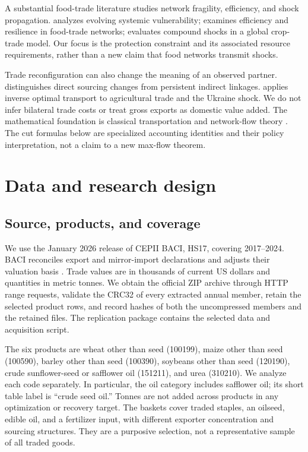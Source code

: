 \documentclass[11pt,a4paper]{article}
\begin{document}
A substantial food-trade literature studies network fragility, efficiency, and shock propagation. \citet{puma} analyzes evolving systemic vulnerability; \citet{karakoc} examines efficiency and resilience in food-trade networks; \citet{verschuur} evaluates compound shocks in a global crop-trade model. Our focus is the protection constraint and its associated resource requirements, rather than a new claim that food networks transmit shocks.

Trade reconfiguration can also change the meaning of an observed partner. \citet{freund} distinguishes direct sourcing changes from persistent indirect linkages. \citet{gaskin} applies inverse optimal transport to agricultural trade and the Ukraine shock. We do not infer bilateral trade costs or treat gross exports as domestic value added. The mathematical foundation is classical transportation and network-flow theory \citep{ford}. The cut formulas below are specialized accounting identities and their policy interpretation, not a claim to a new max-flow theorem.

\section{Data and research design}
\subsection{Source, products, and coverage}
We use the January 2026 release of CEPII BACI, HS17, covering 2017--2024. BACI reconciles export and mirror-import declarations and adjusts their valuation basis \citep{baci}. Trade values are in thousands of current US dollars and quantities in metric tonnes. We obtain the official ZIP archive through HTTP range requests, validate the CRC32 of every extracted annual member, retain the selected product rows, and record hashes of both the uncompressed members and the retained files. The replication package contains the selected data and acquisition script.

The six products are wheat other than seed (100199), maize other than seed (100590), barley other than seed (100390), soybeans other than seed (120190), crude sunflower-seed or safflower oil (151211), and urea (310210). We analyze each code separately. In particular, the oil category includes safflower oil; its short table label is ``crude seed oil.'' Tonnes are not added across products in any optimization or recovery target. The baskets cover traded staples, an oilseed, edible oil, and a fertilizer input, with different exporter concentration and sourcing structures. They are a purposive selection, not a representative sample of all traded goods.
\end{document}
